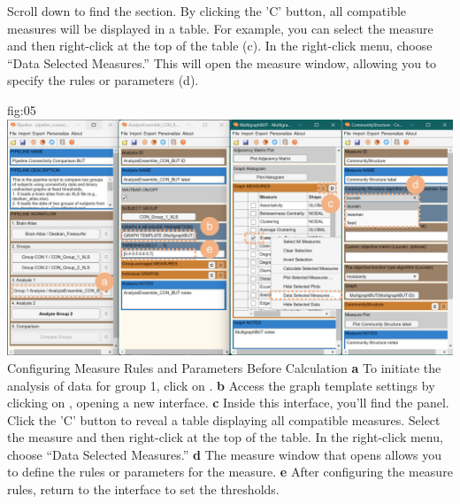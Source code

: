 \documentclass[justified]{tufte-handout}
\begin{document}
Scroll down to find the  section. 
By clicking the 'C' button, all compatible measures will be displayed in a table. 
For example, you can select the  measure and then right-click at the top of the table (c). 
In the right-click menu, choose “Data Selected Measures.” 
This will open the measure window, allowing you to specify the rules or parameters (d).

	{fig:05}
	{
	\includegraphics{fig05.jpg}
	}
	{Configuring Measure Rules and Parameters Before Calculation}
	{
	{\bf a} To initiate the analysis of data for group 1, click on .
	{\bf b} Access the graph template settings by clicking on , opening a new interface.
	{\bf c} Inside this interface, you'll find the  panel. Click the 'C' button to reveal a table displaying all compatible measures. Select the  measure and then right-click at the top of the table. In the right-click menu, choose “Data Selected Measures.”
	{\bf d} The measure window that opens allows you to define the rules or parameters for the  measure.
	{\bf e} After configuring the measure rules, return to the  interface to set the thresholds.
	}
\end{document}

